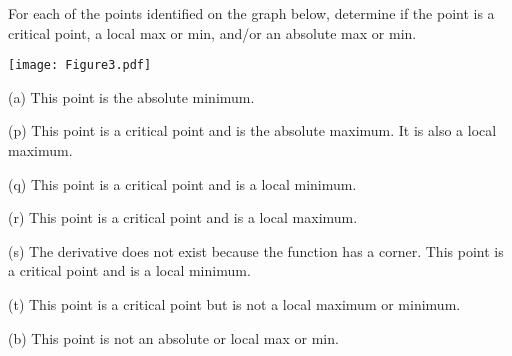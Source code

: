 \documentclass[handout,nooutcomes]{ximera}
\begin{document}
\begin{problem}
For each of the points identified on the graph below, determine if the point is a critical point, a local max or min, and/or an absolute max or min.

	\begin{center}
	\begin{image}
	\texttt{[image: Figure3.pdf]}
	\end{image}
	\end{center}	
	
		\begin{freeResponse}
(a) This point is the absolute minimum.

(p) This point is a critical point and is the absolute maximum.  It is also a local maximum.

(q) This point is a critical point and is a local minimum.

(r) This point is a critical point and is a local maximum.

(s) The derivative does not exist because the function has a corner.  This point is a critical point and is a local minimum.

(t) This point is a critical point but is not a local maximum or minimum.

(b) This point is not an absolute or local max or min.
		\end{freeResponse}	
		
\end{problem}
\end{document}
